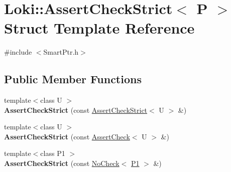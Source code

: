 \hypertarget{structLoki_1_1AssertCheckStrict}{}\section{Loki\+:\+:Assert\+Check\+Strict$<$ P $>$ Struct Template Reference}
\label{structLoki_1_1AssertCheckStrict}


{\ttfamily \#include $<$Smart\+Ptr.\+h$>$}

\subsection*{Public Member Functions}
\begin{DoxyCompactItemize}
\item 
\hypertarget{structLoki_1_1AssertCheckStrict_acdbfe929fba30106ffa04a1ced101b3c}{}{\footnotesize template$<$class U $>$ }\\{\bfseries Assert\+Check\+Strict} (const \hyperlink{structLoki_1_1AssertCheckStrict}{Assert\+Check\+Strict}$<$ U $>$ \&)\label{structLoki_1_1AssertCheckStrict_acdbfe929fba30106ffa04a1ced101b3c}

\item 
\hypertarget{structLoki_1_1AssertCheckStrict_ada799eb648efbb93e16279c5ff70d71d}{}{\footnotesize template$<$class U $>$ }\\{\bfseries Assert\+Check\+Strict} (const \hyperlink{structLoki_1_1AssertCheck}{Assert\+Check}$<$ U $>$ \&)\label{structLoki_1_1AssertCheckStrict_ada799eb648efbb93e16279c5ff70d71d}

\item 
\hypertarget{structLoki_1_1AssertCheckStrict_a650a3032df2fd38ac2f842f44931b7a7}{}{\footnotesize template$<$class P1 $>$ }\\{\bfseries Assert\+Check\+Strict} (const \hyperlink{structLoki_1_1NoCheck}{No\+Check}$<$ \hyperlink{structP1}{P1} $>$ \&)\label{structLoki_1_1AssertCheckStrict_a650a3032df2fd38ac2f842f44931b7a7}

\end{DoxyCompactItemize}
